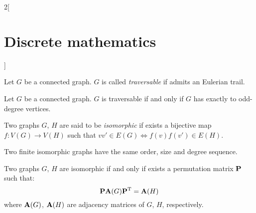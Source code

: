\documentclass[../../../main.tex]{subfiles}
\begin{document}
\begin{multicols}{2}[\section{Discrete mathematics}]
\begin{definition}
        Let $G$ be a connected graph. $G$ is called \textit{traversable} if admits an Eulerian trail.
    \end{definition}
    \begin{theorem}
        Let $G$ be a connected graph. $G$ is traversable if and only if $G$ has exactly to odd-degree vertices.
    \end{theorem}
    \begin{definition}
        Two graphs $G$, $H$ are said to be \textit{isomorphic} if exists a bijective map $f:V(G)\rightarrow V(H)$ such that $vv'\in E(G)\iff f(v)f(v')\in E(H)$.
    \end{definition}
    \begin{prop}
        Two finite isomorphic graphs have the same order, size and degree sequence.
    \end{prop}
    \begin{theorem}
        Two graphs $G$, $H$ are isomorphic if and only if exists a permutation matrix $\boldsymbol{\mathrm{P}}$ such that: $$\boldsymbol{\mathrm{P}}\boldsymbol{\mathrm{A}}(G)\vb{P}^{\mathrm{T}}=\boldsymbol{\mathrm{A}}(H)$$ where $\boldsymbol{\mathrm{A}}(G)$, $\boldsymbol{\mathrm{A}}(H)$ are adjacency matrices of $G$, $H$, respectively.
    \end{theorem}

\end{multicols}
\end{document}
